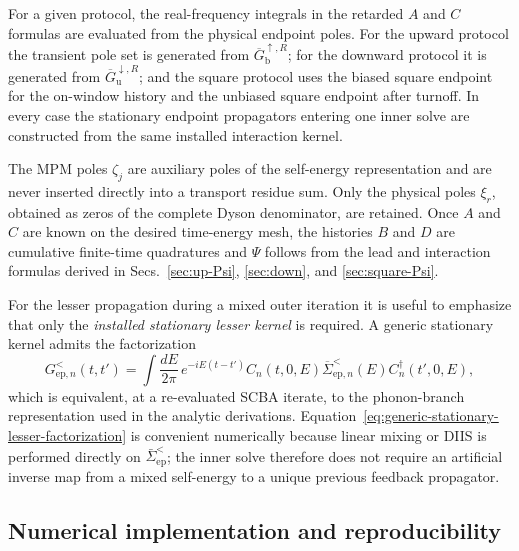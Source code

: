 \documentclass[
 reprint,
 superscriptaddress,
 amsmath,amssymb,
 aps,prb,
 longbibliography,
 floatfix
]{revtex4-2}
\newcommand{\ep}{\mathrm{ep}}
\newcommand{\barSigma}{\overline{\Sigma}}
\begin{document}
For a given protocol, the real-frequency integrals in the retarded \(A\) and \(C\) formulas are evaluated from the physical endpoint poles. For the upward protocol the transient pole set is generated from \(\overline G_{\mathrm b}^{\uparrow,R}\); for the downward protocol it is generated from \(\overline G_{\mathrm u}^{\downarrow,R}\); and the square protocol uses the biased square endpoint for the on-window history and the unbiased square endpoint after turnoff. In every case the stationary endpoint propagators entering one inner solve are constructed from the same installed interaction kernel.

The MPM poles \(\zeta_j\) are auxiliary poles of the self-energy representation and are never inserted directly into a transport residue sum. Only the physical poles \(\xi_r\), obtained as zeros of the complete Dyson denominator, are retained. Once \(A\) and \(C\) are known on the desired time-energy mesh, the histories \(B\) and \(D\) are cumulative finite-time quadratures and \(\Psi\) follows from the lead and interaction formulas derived in Secs.~\ref{sec:up-Psi}, \ref{sec:down}, and \ref{sec:square-Psi}.

For the lesser propagation during a mixed outer iteration it is useful to emphasize that only the \emph{installed stationary lesser kernel} is required. A generic stationary kernel admits the factorization
\begin{equation}
G_{\ep,n}^{<}(t,t')
=
\int\frac{dE}{2\pi}\,
e^{-iE(t-t')}
C_n(t,0,E)
\barSigma_{\ep,n}^{<}(E)
C_n^{\dagger}(t',0,E),
\label{eq:generic-stationary-lesser-factorization}
\end{equation}
which is equivalent, at a re-evaluated SCBA iterate, to the phonon-branch representation used in the analytic derivations. Equation~\eqref{eq:generic-stationary-lesser-factorization} is convenient numerically because linear mixing or DIIS is performed directly on \(\bar\Sigma_{\ep}^{<}\); the inner solve therefore does not require an artificial inverse map from a mixed self-energy to a unique previous feedback propagator.

\subsection{Numerical implementation and reproducibility}
\label{sec:dot-code}
\end{document}
